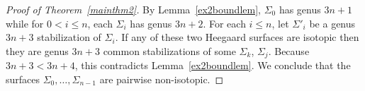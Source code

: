 \documentclass[12pt]{amsart}
\theoremstyle{plain}
\theoremstyle{definition}
\begin{document}
\begin{proof}[Proof of Theorem~\ref{mainthm2}]
By Lemma~\ref{ex2boundlem}, $\Sigma_0$ has genus $3n+1$ while for $0 < i \leq n$, each $\Sigma_i$ has genus $3n+2$.  For each $i \leq n$, let $\Sigma'_i$ be a genus $3n + 3$ stabilization of $\Sigma_i$.  If any of these two Heegaard surfaces are isotopic then they are genus $3n+3$ common stabilizations of some $\Sigma_k$, $\Sigma_j$.  Because $3n+3 < 3n+4$, this contradicts Lemma~\ref{ex2boundlem}.  We conclude that the surfaces $\Sigma_0,\dots,\Sigma_{n-1}$ are pairwise non-isotopic.
\end{proof}



\end{document}
